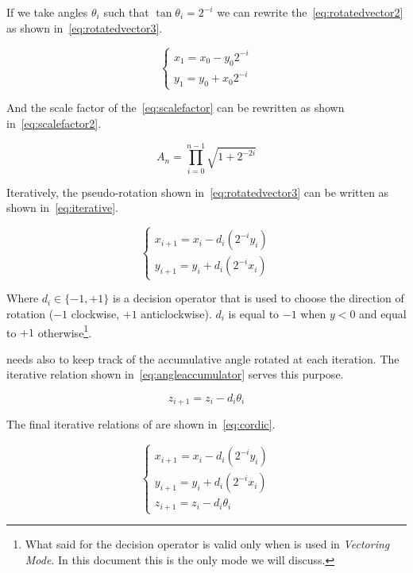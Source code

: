If we take angles \(\theta_i\) such that \(\tan\theta_i = 2^{-i}\) we can
rewrite the~\eqref{eq:rotatedvector2} as shown in~\eqref{eq:rotatedvector3}.

\begin{equation}\label{eq:rotatedvector3}
	\begin{cases}
		x_1 = x_0 - y_0 2^{-i}\\
		y_1 = y_0 + x_0 2^{-i}
	\end{cases}
\end{equation}

And the scale factor of the~\eqref{eq:scalefactor} can be rewritten as shown
in~\eqref{eq:scalefactor2}.

\begin{equation}\label{eq:scalefactor2}
	A_n = \prod_{i=0}^{n-1} \sqrt{1 + 2^{-2i}}
\end{equation}

Iteratively, the pseudo-rotation shown in~\eqref{eq:rotatedvector3} can be
written as shown in~\eqref{eq:iterative}.

\begin{equation}\label{eq:iterative}
	\begin{cases}
		x_{i+1} = x_i - d_i(2^{-i}y_i)\\
		y_{i+1} = y_i + d_i(2^{-i}x_i)
	\end{cases}
\end{equation}

Where \(d_i \in \{-1, +1\}\) is a decision operator that is used to choose the
direction of rotation (\(-1\) clockwise, \(+1\) anticlockwise). \(d_i\) is equal
to \(-1\) when \(y < 0\) and equal to \(+1\) otherwise\footnote{What said for
the decision operator is valid only when \cordic{} is used in \emph{Vectoring
Mode}. In this document this is the only mode we will discuss.}.

\cordic{} needs also to keep track of the accumulative angle rotated at each
iteration. The iterative relation shown in~\eqref{eq:angleaccumulator} serves
this purpose.

\begin{equation}\label{eq:angleaccumulator}
	z_{i+1} = z_i - d_i\theta_i
\end{equation}

The final iterative relations of \cordic{} are shown in~\eqref{eq:cordic}.

\begin{equation}\label{eq:cordic}
	\begin{cases}
		x_{i+1} = x_i - d_i(2^{-i}y_i)\\
		y_{i+1} = y_i + d_i(2^{-i}x_i)\\
		z_{i+1} = z_i - d_i\theta_i
	\end{cases}
\end{equation}

